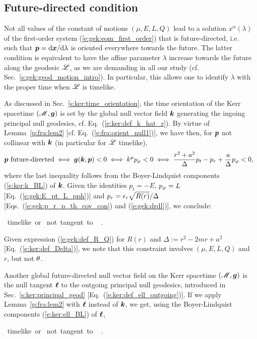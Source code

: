 \subsection{Future-directed condition}

Not all values of the constant of motions $(\mu,E,L,Q)$ lead to a solution
$x^\alpha(\lambda)$ of the first-order system (\ref{e:gek:eom_first_order})
that is future-directed, i.e. such that $\bm{p} = \mathrm{d} \bm{x}/\mathrm{d}\lambda$
is oriented everywhere towards the future.
The latter condition is equivalent to have the affine parameter $\lambda$ increase
towards the future along the geodesic $\mathscr{L}$, as we are demanding in all
our study (cf. Sec.~\ref{s:gek:geod_motion_intro}).
In particular, this allows one to identify $\lambda$ with the proper
time when $\mathscr{L}$ is timelike.


As discussed in Sec.~\ref{s:ker:time_orientation}, the time orientation of
the Kerr spacetime $(\mathscr{M},\bm{g})$ is set by the global null
vector field $\bm{k}$ generating the ingoing principal null geodesics, cf. Eq.~(\ref{e:ker:def_k_hat_r}).
By virtue of Lemma~\ref{p:fra:lem2}
[cf. Eq.~(\ref{e:fra:orient_null1})], we have then, for $\bm{p}$ not collinear
with $\bm{k}$ (in particular for $\mathscr{L}$ timelike),
\[
    \bm{p} \ \mbox{future-directed} \iff \bm{g}(\bm{k},\bm{p}) < 0
    \iff k^\mu p_\mu < 0
    \iff \frac{r^2 + a^2}{\Delta} p_t - p_r + \frac{a}{\Delta} p_\varphi < 0 ,
\]
where the last inequality follows from the Boyer-Lindquist components
(\ref{e:ker:k_BL}) of $\bm{k}$.
Given the identities $p_t = -E$, $p_\varphi = L$
[Eq.~(\ref{e:gek:E_pt_L_pph})] and $p_r = \epsilon_r \sqrt{R(r)}/ \Delta $
[Eqs.~(\ref{e:gek:p_r_p_th_cov_con})
and (\ref{e:gek:drdl})], we conclude:
\begin{prop}
\be \label{e:gek:future_directed}
{\Li \ \mbox{timelike or}\atop
{} \ \mbox{not tangent to} \ \Li} \implies
{} .
\ee
\end{prop}
Given expression (\ref{e:gek:def_R_Q}) for $R(r)$ and
$\Delta := r^2 - 2m r + a^2$ [Eq.~(\ref{e:ker:def_Delta})],
we note that this constraint involves $(\mu,E,L,Q)$ and $r$, but not $\theta$.

Another global future-directed null vector field on the Kerr spacetime $(\mathscr{M},\bm{g})$ is the null tangent
$\bm{\ell}$ to the outgoing principal null geodesics, introduced in Sec.~\ref{s:ker:principal_geod} [Eq.~(\ref{e:ker:def_ell_outgoing})]. If we apply Lemma~\ref{p:fra:lem2}  with $\bm{\ell}$ instead
of $\bm{k}$, we get, using the Boyer-Lindquist components (\ref{e:ker:ell_BL}) of $\bm{\ell}$,
\begin{prop}
\be \label{e:gek:future_directed_l}
{\Li \ \mbox{timelike or}\atop
\wl \ \mbox{not tangent to} \ \Li} \implies
{} .
\ee
\end{prop}

